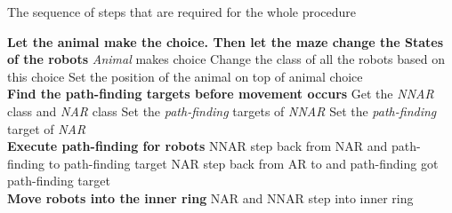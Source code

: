 \begin{algorithm}[H]
\caption{The sequence of steps that are required for the whole procedure}
\begin{algorithmic}[1]
\STATE \textbf{Let the animal make the choice. Then let the maze change the States of the robots} 
\bindent{}
    \STATE \textit{Animal} makes choice
	\STATE Change the class of all the robots based on this choice
	\STATE Set the position of the animal on top of animal choice
\eindent{}
\\ \textbf{Find the path-finding targets before movement occurs}
\bindent{}
	\STATE Get the \textit{NNAR} class and \textit{NAR} class
	\STATE Set the \textit{path-finding} targets of \textit{NNAR}
	\STATE Set the \textit{path-finding} target of \textit{NAR}
\eindent{}
\\ \textbf{Execute path-finding for robots}
\bindent{}
	\STATE NNAR step back from NAR
	\STATE and path-finding to path-finding target
	\STATE NAR step back from AR
to	\STATE and path-finding got path-finding target
\eindent{}
\\ \textbf{Move robots into the inner ring}
\bindent{}
	\STATE NAR and NNAR step into inner ring
\eindent{}


\end{algorithmic}
\end{algorithm}

